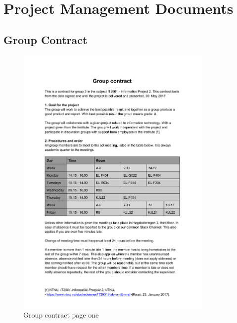 \chapter{Project Management Documents}


\section{Group Contract}
\label{group_contract}

\begin{figure}[H]
\centering
    \includegraphics[width=0.85\textwidth]{fig/GroupContract1.pdf}
    \caption{Group contract page one}
    \label{Group_Contract_1}
\end{figure}

